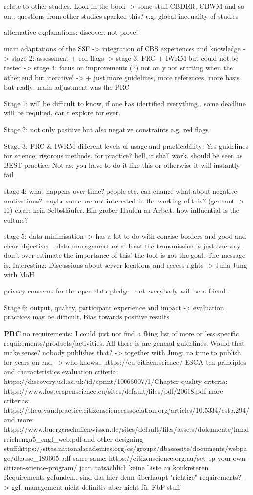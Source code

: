relate to other studies. Look in the book -> some stuff CBDRR, CBWM and so on..
questions from other studies sparked this? e.g. global inequality of studies

alternative explanations:
discover. not prove!


main adaptations of the SSF -> integration of CBS experiences and knowledge
-> stage 2: assessment + red flags
-> stage 3: PRC + IWRM but could not be tested
-> stage 4: focus on improvements (?) not only not starting when the other end but iterative!
-> + just more guidelines, more references, more basis
but really: main adjustment was the PRC

Stage 1:
will be difficult to know, if one has identified everything.. some deadline will be required. can't explore for ever.

Stage 2:
not only positive but also negative constraints e.g. red flags

Stage 3:
PRC & IWRM
different levels of usage and practicability: Yes guidelines for science: rigorous methods. for practice? hell, it shall work.
should be seen as BEST practice. Not as: you have to do it like this or otherwise it will instantly fail

stage 4:
what happens over time? people etc. can change
what about negative motivations? maybe some are not interested in the working of this? (gennant -> I1)
clear: kein Selbstläufer. Ein großer Haufen an Arbeit.
how influential is the culture?

stage 5:
data minimisation -> has a lot to do with concise borders and good and clear objectives
- data management or at least the transmission is just one way - don't over estimate the importance of this! the tool is not the goal. The message is.
Interesting: Discussions about server locations and access rights -> Julia Jung with MoH

privacy concerns for the open data pledge.. not everybody will be a friend..


Stage 6:
output, quality, participant experience and impact
-> evaluation practices may be difficult. Bias towards positive results

\textbf{PRC}
no requirements: I could just not find a fking list of more or less specific requirements/products/activities. All there is are general guidelines. Would that make sense? nobody publishes that? -> together with Jung: no time to publish for years on end --> who knows.. 
https://eu-citizen.science/
ESCA ten principles and characteristics
evaluation criteria: https://discovery.ucl.ac.uk/id/eprint/10066007/1/Chapter%
quality criteria: https://www.fosteropenscience.eu/sites/default/files/pdf/20608.pdf
more criterias: https://theoryandpractice.citizenscienceassociation.org/articles/10.5334/cstp.294/
and more: https://www.buergerschaffenwissen.de/sites/default/files/assets/dokumente/handreichunga5_engl_web.pdf
and other designing stuff:https://sites.nationalacademies.org/cs/groups/dbassesite/documents/webpage/dbasse_189605.pdf
same same: https://citizenscience.org.au/set-up-your-own-citizen-science-program/
joar. tatsächlich keine Liste an konkreteren Requirements gefunden.. sind das hier denn überhaupt "richtige" requirements?
-> ggf. management nicht
definitiv aber nicht für FbF stuff

